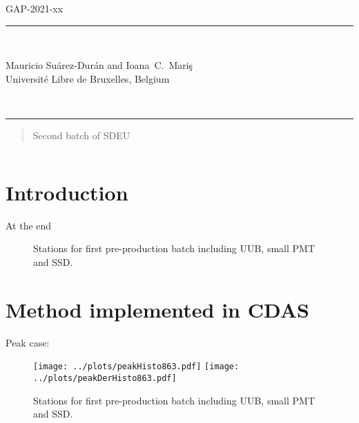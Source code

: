\documentclass[twoside, final, 10pt]{articleMine}
\begin{document}
\setpagewiselinenumbers
\modulolinenumbers[2]

\linenumbers

\renewcommand\linenumberfont{\small\rmfamily}
\begin{flushright}
GAP-2021-xx
\end{flushright}

\begin{flushright}

  \rule{\linewidth}{0.5mm}
  \\[17mm]

  \vspace*{-3ex}{\Large Base Line studies for SDEU}

  \large
  \parbox[b]{15cm}{
    \begin{flushright}
      Mauricio Su\'arez-Dur\'an and  Ioana~C.~Mari\c{s}
     \\[6mm]
       {\small Universit{\'e} Libre de Bruxelles, Belgium}

  \end{flushright}}
  \\[5mm]
  \rule{\linewidth}{0.5mm}

\end{flushright}
%
%
\thispagestyle{empty}
\noindent
\begin{abstract}
  \noindent
	Second batch of SDEU	

\end{abstract}

%
%
\thispagestyle{empty}
$\;$
\noindent

\section*{Introduction}
  At the end
	\begin{figure}[!tbh]
		\centering
		\caption{Stations for first pre-production batch including UUB, small PMT and SSD.}
		\label{figMapSt}
	\end{figure}
\clearpage

\section*{Method implemented in CDAS}
Peak case:

\begin{figure}[!tbh]
  \centering
  \subfigure
  {
    \texttt{[image: ../plots/peakHisto863.pdf]}
    \texttt{[image: ../plots/peakDerHisto863.pdf]}
  }
  \caption{Stations for first pre-production batch including UUB, small PMT and SSD.}
  \label{figPkVemserie}
\end{figure}
\end{document}
